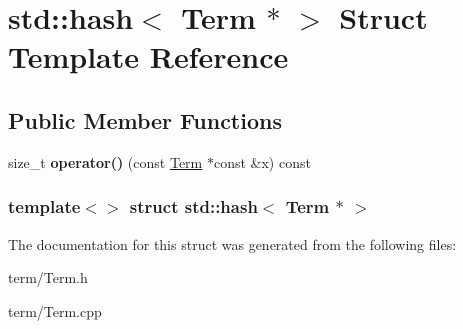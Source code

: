 \hypertarget{structstd_1_1hash_3_01Term_01_5_01_4}{\section{std\-:\-:hash$<$ \-Term $\ast$ $>$ \-Struct \-Template \-Reference}
\label{structstd_1_1hash_3_01Term_01_5_01_4}
}
\subsection*{\-Public \-Member \-Functions}
\begin{DoxyCompactItemize}
\item 
\hypertarget{structstd_1_1hash_3_01Term_01_5_01_4_a8206545c88d483e79d57d0549522e5eb}{size\-\_\-t {\bfseries operator()} (const \hyperlink{classTerm}{\-Term} $\ast$const \&x) const }\label{structstd_1_1hash_3_01Term_01_5_01_4_a8206545c88d483e79d57d0549522e5eb}

\end{DoxyCompactItemize}
\subsubsection*{template$<$$>$ struct std\-::hash$<$ Term $\ast$ $>$}



\-The documentation for this struct was generated from the following files\-:\begin{DoxyCompactItemize}
\item 
term/\-Term.\-h\item 
term/\-Term.\-cpp\end{DoxyCompactItemize}

